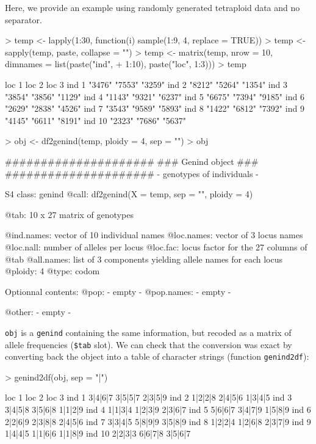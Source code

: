 \documentclass{article}
\begin{document}
Here, we provide an example using randomly generated tetraploid data and no separator.
\begin{Schunk}
\begin{Sinput}
> temp <- lapply(1:30, function(i) sample(1:9, 4, replace = TRUE))
> temp <- sapply(temp, paste, collapse = "")
> temp <- matrix(temp, nrow = 10, dimnames = list(paste("ind", 
+     1:10), paste("loc", 1:3)))
> temp
\end{Sinput}
\begin{Soutput}
       loc 1  loc 2  loc 3 
ind 1  "3476" "7553" "3259"
ind 2  "8212" "5264" "1354"
ind 3  "3854" "3856" "1129"
ind 4  "1143" "9321" "6237"
ind 5  "6675" "7394" "9185"
ind 6  "2629" "2838" "4526"
ind 7  "3543" "9589" "5893"
ind 8  "1422" "6812" "7392"
ind 9  "4145" "6611" "8191"
ind 10 "2323" "7686" "5637"
\end{Soutput}
\begin{Sinput}
> obj <- df2genind(temp, ploidy = 4, sep = "")
> obj
\end{Sinput}
\begin{Soutput}
   #####################
   ### Genind object ### 
   #####################
- genotypes of individuals - 

S4 class:  genind
@call: df2genind(X = temp, sep = "", ploidy = 4)

@tab:  10 x 27 matrix of genotypes

@ind.names: vector of  10 individual names
@loc.names: vector of  3 locus names
@loc.nall: number of alleles per locus
@loc.fac: locus factor for the  27 columns of @tab
@all.names: list of  3 components yielding allele names for each locus
@ploidy:  4
@type:  codom

Optionnal contents: 
@pop:  - empty -
@pop.names:  - empty -

@other: - empty -
\end{Soutput}
\end{Schunk}

\noindent \texttt{obj} is a \texttt{genind} containing the same information, but recoded as a matrix of allele
frequencies (\texttt{\$tab} slot).
We can check that the conversion was exact by converting back the object into a table of character
strings (function \texttt{genind2df}):
\begin{Schunk}
\begin{Sinput}
> genind2df(obj, sep = "|")
\end{Sinput}
\begin{Soutput}
         loc 1   loc 2   loc 3
ind 1  3|4|6|7 3|5|5|7 2|3|5|9
ind 2  1|2|2|8 2|4|5|6 1|3|4|5
ind 3  3|4|5|8 3|5|6|8 1|1|2|9
ind 4  1|1|3|4 1|2|3|9 2|3|6|7
ind 5  5|6|6|7 3|4|7|9 1|5|8|9
ind 6  2|2|6|9 2|3|8|8 2|4|5|6
ind 7  3|3|4|5 5|8|9|9 3|5|8|9
ind 8  1|2|2|4 1|2|6|8 2|3|7|9
ind 9  1|4|4|5 1|1|6|6 1|1|8|9
ind 10 2|2|3|3 6|6|7|8 3|5|6|7
\end{Soutput}
\end{Schunk}
\end{document}
